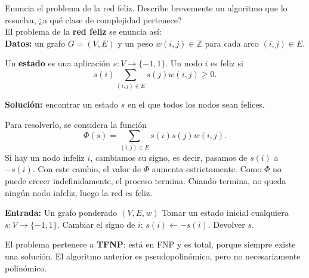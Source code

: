 \documentclass[12pt]{article}
\begin{document}
    \begin{ejercicio}[1.3 puntos]
        Enuncia el problema de la red feliz. Describe brevemente un algoritmo que lo resuelva, ¿a qué clase de complejidad pertenece? \\

        El problema de la \textbf{red feliz} se enuncia así: \\

        \textbf{Datos:} un grafo $G=(V,E)$ y un peso $w(i,j)\in \mathbb{Z}$ para cada arco $(i,j)\in E$.

        Un \textbf{estado} es una aplicación
        $
        s:V\to\{-1,1\}.
        $
        Un nodo $i$ es feliz si
        $$
        s(i)\sum_{(i,j)\in E}s(j)w(i,j)\geq 0.
        $$

        \textbf{Solución:} encontrar un estado $s$ en el que todos los nodos sean felices.

        Para resolverlo, se considera la función
        $$
        \Phi(s)=\sum_{(i,j)\in E}s(i)s(j)w(i,j).
        $$
        Si hay un nodo infeliz $i$, cambiamos su signo, es decir, pasamos de $s(i)$ a $-s(i)$. Con este cambio, el valor de $\Phi$ aumenta estrictamente. Como $\Phi$ no puede crecer indefinidamente, el proceso termina. Cuando termina, no queda ningún nodo infeliz, luego la red es feliz.

        \begin{algorithm}
        \caption{Algoritmo para red feliz}
        \begin{algorithmic}
        \State \textbf{Entrada:} Un grafo ponderado $(V,E,w)$
        \State Tomar un estado inicial cualquiera $s:V\to\{-1,1\}$.
            \State Cambiar el signo de $i$: $s(i)\gets -s(i)$.
        \EndWhile
        \State Devolver $s$.
        \end{algorithmic}
        \end{algorithm}

        El problema pertenece a \textbf{TFNP}: está en FNP y es total, porque siempre existe una solución. El algoritmo anterior es pseudopolinómico, pero no necesariamente polinómico.
    \end{ejercicio}
\end{document}
